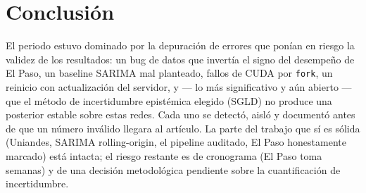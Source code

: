 \documentclass[12pt,a4paper]{article}
\begin{document}
\section{Conclusión}

El periodo estuvo dominado por la depuración de errores que ponían en riesgo
la validez de los resultados: un bug de datos que invertía el signo del
desempeño de El Paso, un baseline SARIMA mal planteado, fallos de CUDA por
\texttt{fork}, un reinicio con actualización del servidor, y --- lo más
significativo y aún abierto --- que el método de incertidumbre epistémica
elegido (SGLD) no produce una posterior estable sobre estas redes. Cada uno
se detectó, aisló y documentó antes de que un número inválido llegara al
artículo. La parte del trabajo que sí es sólida (Uniandes, SARIMA
rolling-origin, el pipeline auditado, El Paso honestamente marcado) está
intacta; el riesgo restante es de cronograma (El Paso toma semanas) y de una
decisión metodológica pendiente sobre la cuantificación de incertidumbre.
\end{document}
